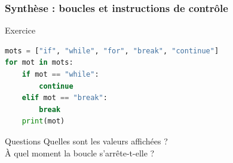 \documentclass[10pt]{beamer}
\begin{document}
\begin{frame}[containsverbatim]
	\frametitle{Synthèse : boucles et instructions de contrôle}
	
	\begin{exampleblock}{Exercice}
		\begin{lstlisting}[language=Python]
mots = ["if", "while", "for", "break", "continue"]
for mot in mots:
	if mot == "while":
		continue
	elif mot == "break":
		break
	print(mot)
		\end{lstlisting}
	\end{exampleblock}
	
	\vspace{0.1cm}
	
	\begin{alertblock}{Questions}
		\centering
		Quelles sont les valeurs affichées ?\\
		À quel moment la boucle s'arrête-t-elle ?
	\end{alertblock}
	
\end{frame}
\end{document}
